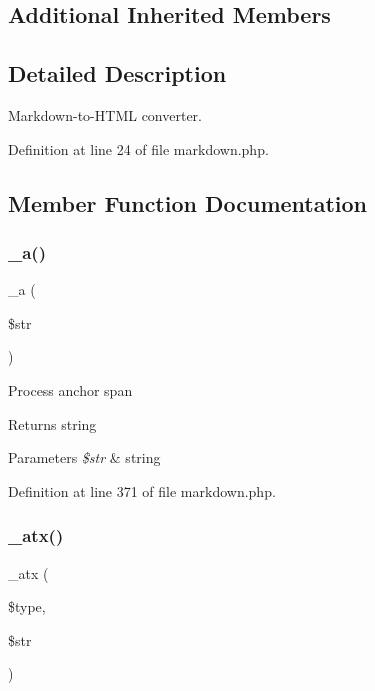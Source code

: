 \subsection*{Additional Inherited Members}


\subsection{Detailed Description}
Markdown-\/to-\/\+H\+T\+ML converter. 

Definition at line 24 of file markdown.\+php.



\subsection{Member Function Documentation}
\hypertarget{class_markdown_a65692f4b6b15029d6e26a80db9e4748c}{}\label{class_markdown_a65692f4b6b15029d6e26a80db9e4748c} 
\subsubsection{\texorpdfstring{\+\_\+a()}{\_a()}}
{\footnotesize\ttfamily \+\_\+a (\begin{DoxyParamCaption}\item[{}]{\$str }\end{DoxyParamCaption})\hspace{0.3cm}{\ttfamily [protected]}}

Process anchor span \begin{DoxyReturn}{Returns}
string 
\end{DoxyReturn}

\begin{DoxyParams}{Parameters}
{\em \$str} & string \\
\hline
\end{DoxyParams}


Definition at line 371 of file markdown.\+php.

\hypertarget{class_markdown_a1018c6d4736c90992988a353d3f0edf3}{}\label{class_markdown_a1018c6d4736c90992988a353d3f0edf3} 
\subsubsection{\texorpdfstring{\+\_\+atx()}{\_atx()}}
{\footnotesize\ttfamily \+\_\+atx (\begin{DoxyParamCaption}\item[{}]{\$type,  }\item[{}]{\$str }\end{DoxyParamCaption})\hspace{0.3cm}{\ttfamily [protected]}}

